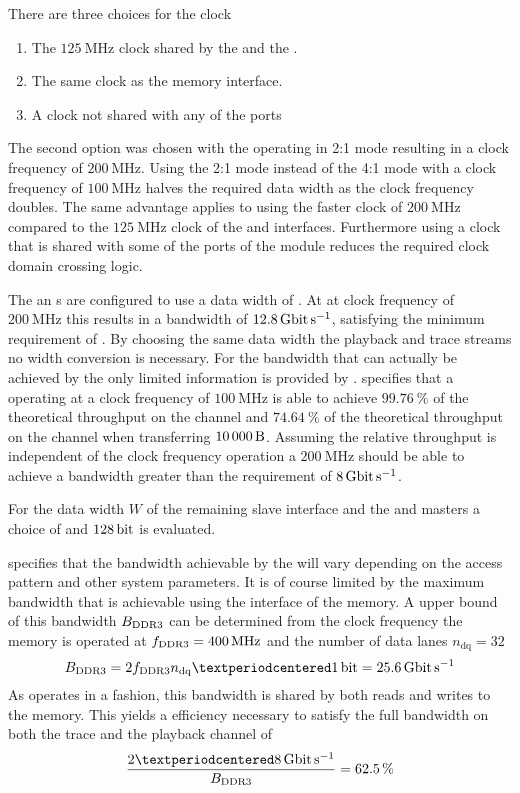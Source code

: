 There are three choices for the clock
\begin{enumerate}
    \item The $\SI{125}{\mega\hertz}$ clock shared by the \HostARQ{} and the \pbexec{}.
    \item The same clock as the \XilinxMIG{} memory interface.
    \item A clock not shared with any of the ports
\end{enumerate}
The second option was chosen with the \XilinxMIG{} operating in 2:1 mode resulting in a clock frequency of $\SI{200}{\mega\hertz}$. Using the 2:1 mode instead of the 4:1 mode with a clock frequency of $\SI{100}{\mega\hertz}$ halves the required data width as the clock frequency doubles. The same advantage applies to using the faster clock of $\SI{200}{\mega\hertz}$ compared to the $\SI{125}{\mega\hertz}$ clock of the \HostARQ{} and \pbexec{} interfaces.
Furthermore using a clock that is shared with some of the ports of the module reduces the required clock domain crossing logic.

The \SToMM{} an \MMToS{} \AXIStream{}s are configured to use a data width of \PhyWordSize{}. At at clock frequency of $\SI{200}{\mega\hertz}$ this results in a bandwidth of $\SI{12.8}{\giga\bit\per\second}$, satisfying the minimum requirement of \pbExecBandwidth{}. By choosing the same data width the \pbexec{} playback and trace streams no width conversion is necessary. For the bandwidth that can actually be achieved by the \AXIDMA{} only limited information is provided by \Xilinx{}. \Xilinx{} specifies that a \AXIDMA{} operating at a clock frequency of $\SI{100}{\mega\hertz}$ is able to achieve $\SI{99.76}{\percent}$ of the theoretical throughput on the \MMToS{} channel and $\SI{74.64}{\percent}$ of the theoretical throughput on the \SToMM{} channel when transferring $\SI{10000}{\byte}$. Assuming the relative throughput is independent of the clock frequency operation a $\SI{200}{\mega\hertz}$ should be able to achieve a bandwidth greater than the requirement of $\pbExecBandwidth{}$.

For the data width $W$ of the remaining \XilinxMIG{} \AXI{} slave interface and the \SToMM{} and \MMToS{} \AXI{} masters a choice of \PhyWordSize{} and $\SI{128}{\bit}$ is evaluated.

\Xilinx{} specifies that the bandwidth achievable by the \XilinxMIG{} will vary depending on the access pattern and other system parameters. It is of course limited by the maximum bandwidth that is achievable using the \DDR{} interface of the memory. A upper bound of this bandwidth $B_{\text{DDR3{}}}$ can be determined from the clock frequency the memory is operated at $f_{\text{DDR3{}}} = \SI{400}{\mega\hertz}$ and the number of data lanes $n_{\text{dq}} = \num{32}$
\[B_{\text{\DDR{}}} = 2 f_{\text{\DDR{}}} n_{\text{dq}} · \SI{1}{\bit} = \SI{25.6}{\giga\bit\per\second}\]
As \DDR{} operates in a \halfduplex{} fashion, this bandwidth is shared by both reads and writes to the memory. This yields a efficiency necessary to satisfy the full bandwidth on both the trace and the playback channel of
\[\frac{2 · \pbExecBandwidth{}}{B_{\text{\DDR{}}}} = \SI{62.5}{\percent}\]

